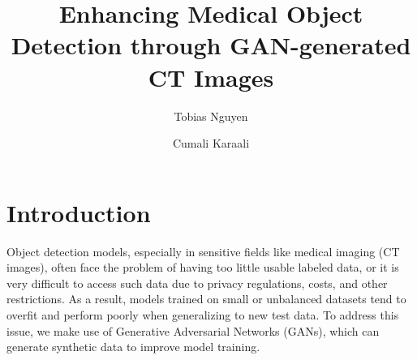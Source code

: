 \documentclass[runningheads]{llncs}
\begin{document}
%
\title{Enhancing Medical Object Detection through GAN-generated CT Images}
%
%
\author{Tobias Nguyen \and
Cumali Karaali}
%
%
%
\maketitle              %
%

%
%
%
\section{Introduction} %
Object detection models, especially in sensitive fields like medical imaging (CT images), often face the problem of having too little usable labeled data, or it is very difficult to access such data due to privacy regulations, costs, and other restrictions. As a result, models trained on small or unbalanced datasets tend to overfit and perform poorly when generalizing to new test data. To address this issue, we make use of Generative Adversarial Networks (GANs), which can generate synthetic data to improve model training.
\end{document}

